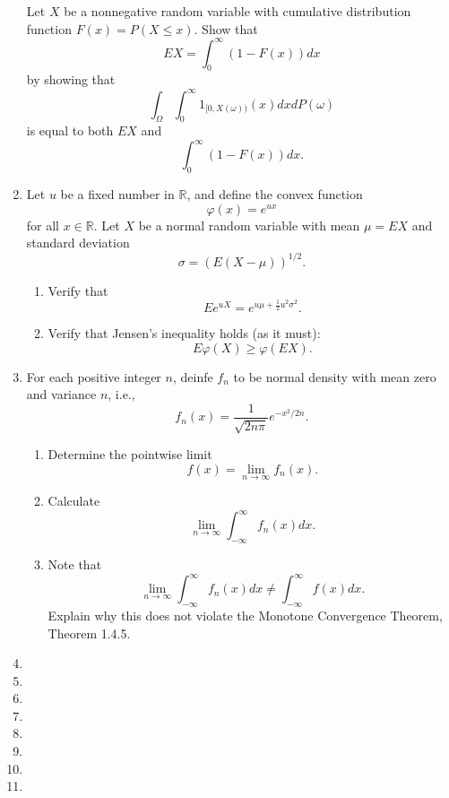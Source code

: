 \documentclass{article}
\begin{document}
\begin{enumerate}
	Let $X$ be a nonnegative random variable with cumulative distribution function $F(x) = P(X \leq x)$. Show that
	$$
	EX = \int_0^\infty (1 - F(x)) dx
	$$
	by showing that
	$$
	\int_\Omega \int_0^\infty 1_{[0, X(\omega))}(x) dx dP(\omega)
	$$
	is equal to both $EX$ and
	$$
	\int_0^\infty (1 - F(x))dx.
 	$$
 	\item Let $u$ be a fixed number in $\mathbb{R}$, and define the convex function
 	$$
 	\varphi(x) = e^{ux}
 	$$
 	for all $x \in \mathbb{R}$. Let $X$ be a normal random variable with mean $\mu = EX$ and standard deviation
 	$$
 	\sigma = (E(X - \mu))^{1 / 2}.
 	$$
 	\begin{enumerate}
 		\item Verify that
 		$$
 		Ee^{uX} = e^{u\mu + \frac{1}{2} u^2 \sigma^2}.
 		$$
 		\item Verify that Jensen's inequality holds (as it must):
 			$$
 			E\varphi(X) \geq \varphi(EX).
 			$$
	\end{enumerate}
	\item For each positive integer $n$, deinfe $f_n$ to be normal density with mean zero and variance $n$, i.e.,
	$$
	f_n(x) = \frac{1}{\sqrt{2n\pi}}e^{- x^2 / 2n}.
	$$
	\begin{enumerate}
	\item Determine the pointwise limit
	$$
	f(x) = \lim_{n \rightarrow \infty} f_n(x).
	$$
	\item Calculate
	$$
	\lim_{n \rightarrow \infty} \int_{-\infty}^\infty f_n(x) dx.
	$$
	\item Note that
	$$
	\lim_{n \rightarrow \infty} \int_{-\infty}^\infty f_n(x) dx \neq \int_{-\infty}^\infty f(x) dx.
	$$
	Explain why this does not violate the Monotone Convergence Theorem, Theorem 1.4.5.
	\end{enumerate}
	\item 
	\item 
	\item 
	\item 
	\item 
	\item 
	\item 
	\item 
\end{enumerate}
\end{document}

